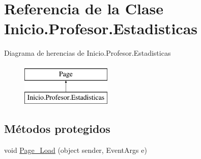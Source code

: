 \hypertarget{classInicio_1_1Profesor_1_1Estadisticas}{}\section{Referencia de la Clase Inicio.\+Profesor.\+Estadisticas}
\label{classInicio_1_1Profesor_1_1Estadisticas}
Diagrama de herencias de Inicio.\+Profesor.\+Estadisticas\begin{figure}[H]
\begin{center}
\leavevmode
\includegraphics[height=2.000000cm]{classInicio_1_1Profesor_1_1Estadisticas}
\end{center}
\end{figure}
\subsection*{Métodos protegidos}
\begin{DoxyCompactItemize}
\item 
void \mbox{\hyperlink{classInicio_1_1Profesor_1_1Estadisticas_a7df8e80159e715292a33d956e01cf592}{Page\+\_\+\+Load}} (object sender, Event\+Args e)
\end{DoxyCompactItemize}
